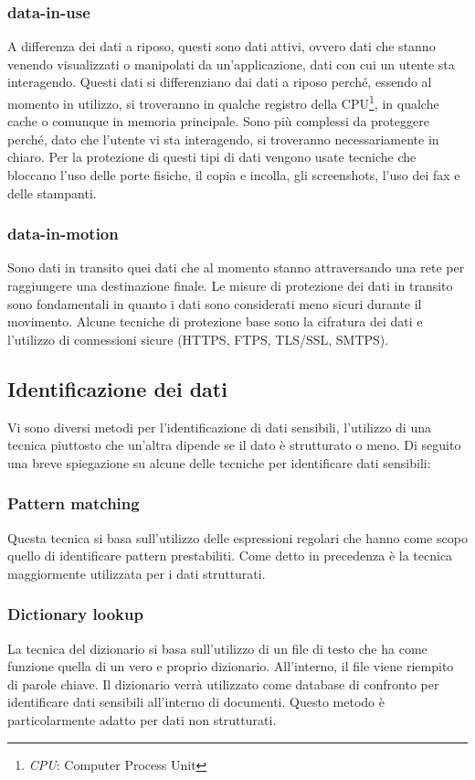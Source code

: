     \subsubsection{data-in-use}
        A differenza dei dati a riposo, questi sono dati attivi, ovvero dati che stanno venendo
        visualizzati o manipolati da un'applicazione, dati con cui un utente sta interagendo. 
        Questi dati si differenziano dai dati a riposo perché, essendo al momento in utilizzo, 
        si troveranno in qualche registro della CPU\footnote{\textit{CPU}: Computer Process Unit}, in qualche cache 
        o comunque in memoria principale. Sono più complessi da proteggere perché, dato che l'utente vi sta
        interagendo, si troveranno necessariamente in chiaro. Per la protezione di questi tipi di dati
        vengono usate tecniche che bloccano l'uso delle porte fisiche, il copia e incolla, gli screenshots, l'uso dei fax
        e delle stampanti.

    \subsubsection{data-in-motion}
        Sono dati in transito quei dati che al momento stanno attraversando una rete per raggiungere 
        una destinazione finale. Le misure di protezione dei dati in transito sono fondamentali in quanto
        i dati sono considerati meno sicuri durante il movimento.
        Alcune tecniche di protezione base sono la cifratura dei dati
        e l'utilizzo di connessioni sicure (HTTPS, FTPS, TLS/SSL, SMTPS).

\subsection{Identificazione dei dati}
    Vi sono diversi metodi per l'identificazione di dati sensibili, l'utilizzo di una tecnica piuttosto che
    un'altra dipende se il dato è strutturato o meno. Di seguito 
    una breve spiegazione su alcune delle tecniche per identificare dati sensibili: \cite{DLP4}
    \subsubsection{Pattern matching}
    Questa tecnica si basa sull'utilizzo delle espressioni regolari che hanno come scopo quello
    di identificare pattern prestabiliti. Come detto in precedenza è la tecnica maggiormente 
    utilizzata per i dati strutturati. 

    \subsubsection{Dictionary lookup}
    La tecnica del dizionario si basa sull'utilizzo di un file di testo che ha come funzione quella
    di un vero e proprio dizionario. All'interno, il file viene riempito di parole chiave. 
    Il dizionario verrà utilizzato come database di confronto per identificare dati sensibili all'interno 
    di documenti. Questo metodo è particolarmente adatto per dati non strutturati.

